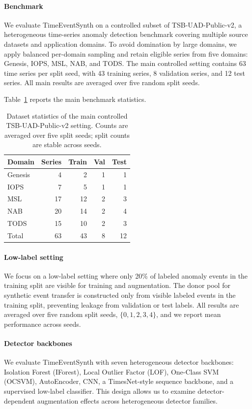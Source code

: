 \documentclass[conference]{IEEEtran}
\begin{document}
\paragraph{Benchmark}

We evaluate TimeEventSynth on a controlled subset of TSB-UAD-Public-v2, a heterogeneous time-series anomaly detection benchmark covering multiple source datasets and application domains. To avoid domination by large domains, we apply balanced per-domain sampling and retain eligible series from five domains: Genesis, IOPS, MSL, NAB, and TODS. The main controlled setting contains 63 time series per split seed, with 43 training series, 8 validation series, and 12 test series. All main results are averaged over five random split seeds.

Table~\ref{tab:dataset_stats} reports the main benchmark statistics.

\begin{table}[t]
\centering
\caption{Dataset statistics of the main controlled TSB-UAD-Public-v2 setting. Counts are averaged over five split seeds; split counts are stable across seeds.}
\label{tab:dataset_stats}
\begin{tabular}{lrrrr}
\toprule
Domain & Series & Train & Val & Test \\
\midrule
Genesis & 4 & 2 & 1 & 1 \\
IOPS & 7 & 5 & 1 & 1 \\
MSL & 17 & 12 & 2 & 3 \\
NAB & 20 & 14 & 2 & 4 \\
TODS & 15 & 10 & 2 & 3 \\
\midrule
Total & 63 & 43 & 8 & 12 \\
\bottomrule
\end{tabular}
\end{table}

\paragraph{Low-label setting}
We focus on a low-label setting where only 20\% of labeled anomaly events in the training split are visible for training and augmentation. The donor pool for synthetic event transfer is constructed only from visible labeled events in the training split, preventing leakage from validation or test labels. All results are averaged over five random split seeds, $\{0,1,2,3,4\}$, and we report mean performance across seeds.

\paragraph{Detector backbones}
We evaluate TimeEventSynth with seven heterogeneous detector backbones: Isolation Forest (IForest), Local Outlier Factor (LOF), One-Class SVM (OCSVM), AutoEncoder, CNN, a TimesNet-style sequence backbone, and a supervised low-label classifier. This design allows us to examine detector-dependent augmentation effects across heterogeneous detector families.
\end{document}
